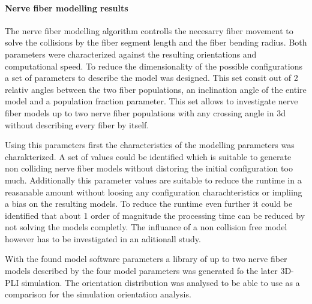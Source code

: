 \paragraph{Nerve fiber modelling results}
% 
The nerve fiber modelling algorithm controlls the necesarry fiber movement to solve the collisions by the fiber segment length and the fiber bending radius.
Both parameters were characterized against the resulting orientations and computational speed.
To reduce the dimensionality of the possible configurations a set of parameters to describe the model was designed.
This set consit out of 2 relativ angles between the two fiber populations, an inclination angle of the entire model and a population fraction parameter.
This set allows to investigate nerve fiber models up to two nerve fiber populations with any crossing angle in 3d without describing every fiber by itself.
\par
% 
Using this parameters first the characteristics of the modelling parameters was charakterized.
A set of values could be identified which is suitable to generate non colliding nerve fiber models without distoring the initial configuration too much.
Additionally this parameter values are suitable to reduce the runtime in a reasanable amount without loosing any configuration charachteristics or impliing a bias on the resulting models.
To reduce the runtime even further it could be identified that about 1 order of magnitude the processing time can be reduced by not solving the models completly.
The influance of a non collision free model however has to be investigated in an aditionall study.
\par
% 
With the found model software parameters a library of up to two nerve fiber models described by the four model parameters was generated fo the later \ac{3D-PLI} simulation.
The orientation distribution was analysed to be able to use as a comparison for the simulation orientation analysis.
% 
% 
% 
